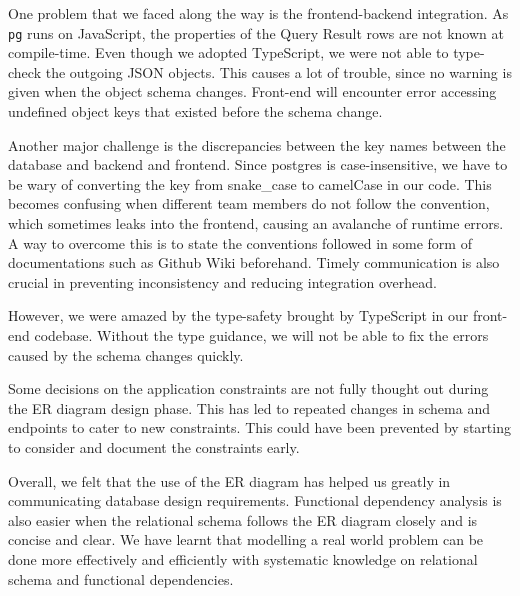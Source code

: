 \documentclass[
  paper=a4,
  ,captions=tableheading
]{scrartcl}
\newcommand{\passthrough}[1]{#1}
\begin{document}
One problem that we faced along the way is the frontend-backend
integration. As \passthrough{\lstinline!pg!} runs on JavaScript, the
properties of the Query Result rows are not known at compile-time. Even
though we adopted TypeScript, we were not able to type-check the
outgoing JSON objects. This causes a lot of trouble, since no warning is
given when the object schema changes. Front-end will encounter error
accessing undefined object keys that existed before the schema change.

Another major challenge is the discrepancies between the key names
between the database and backend and frontend. Since postgres is
case-insensitive, we have to be wary of converting the key from
snake\_case to camelCase in our code. This becomes confusing when
different team members do not follow the convention, which sometimes
leaks into the frontend, causing an avalanche of runtime errors. A way
to overcome this is to state the conventions followed in some form of
documentations such as Github Wiki beforehand. Timely communication is
also crucial in preventing inconsistency and reducing integration
overhead.

However, we were amazed by the type-safety brought by TypeScript in our
front-end codebase. Without the type guidance, we will not be able to
fix the errors caused by the schema changes quickly.

Some decisions on the application constraints are not fully thought out
during the ER diagram design phase. This has led to repeated changes in
schema and endpoints to cater to new constraints. This could have been
prevented by starting to consider and document the constraints early.

Overall, we felt that the use of the ER diagram has helped us greatly in
communicating database design requirements. Functional dependency
analysis is also easier when the relational schema follows the ER
diagram closely and is concise and clear. We have learnt that modelling
a real world problem can be done more effectively and efficiently with
systematic knowledge on relational schema and functional dependencies.
\end{document}
